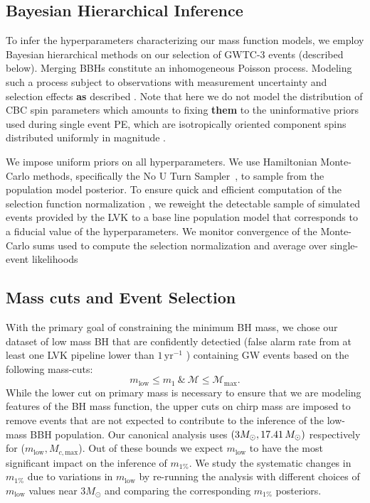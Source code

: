 \documentclass[modern]{aastex631}
\begin{document}
\subsection{Bayesian Hierarchical Inference}
\noindent

To infer the hyperparameters characterizing our mass function models, we employ
Bayesian hierarchical methods on our selection of GWTC-3 events (described
below). Merging BBHs constitute an inhomogeneous Poisson
process.  Modeling such a process subject to observations with
measurement uncertainty and selection effects \textbf{as} described
\citet{Mandel:2018mve,pop-vitale,popgw2,popgw3}.
Note that here we do not model the distribution of CBC spin parameters which
amounts to fixing \textbf{them} to the uninformative priors used during single event
PE, which are isotropically oriented component spins distributed uniformly in
magnitude \citep{KAGRA:2021duu}.  

We impose uniform priors on all hyperparameters. We use Hamiltonian Monte-Carlo
methods, specifically the No U Turn Sampler~\citep[NUTS, ][]{HMC, HMC-NUTS}, to
sample from the population model posterior. To ensure quick and efficient
computation of the selection function normalization \citep{Mandel:2018mve}, we
reweight the detectable sample of simulated events provided by the LVK
\citep{KAGRA:2021duu} to a base line population model that corresponds to a
fiducial value of the hyperparameters.  We monitor convergence of the
Monte-Carlo sums used to compute the selection normalization and average over
single-event likelihoods \citep{Pdet1-Farr,Pdet2-essick,Talbot2023}

\subsection{Mass cuts and Event Selection}
With the primary goal of constraining the minimum BH mass, we chose our dataset
of low mass BH that are confidently detectied (false alarm rate from at least
one LVK pipeline lower than $1 \, \mathrm{yr}^{-1}$ \citet{KAGRA:2021duu})
containing GW events based on the following mass-cuts:
\begin{equation}
	m_\mathrm{low}\leq m_1 ~\&~\mathcal{M}\leq \mathcal{M}_{\mathrm{max}}.
\end{equation}
While the lower cut on primary mass is necessary to ensure that we are modeling
features of the BH mass function, the upper cuts on chirp mass are
imposed to remove events that are not expected to contribute to the inference of
the low-mass BBH population. Our canonical analysis uses $(3M_{\odot},
17.41 \, M_\odot)$ respectively for ($m_\mathrm{low},
M_{c,\mathrm{max}}$). Out of these bounds we expect $m_\mathrm{low}$ to
have the most significant impact on the inference of $m_{1\%}$. We study the
systematic changes in $m_{1\%}$ due to variations in $m_\mathrm{low}$ by re-running the analysis with different choices of $m_\mathrm{low}$ values near $3M_{\odot}$ and comparing the
corresponding $m_{1\%}$ posteriors.
\end{document}
